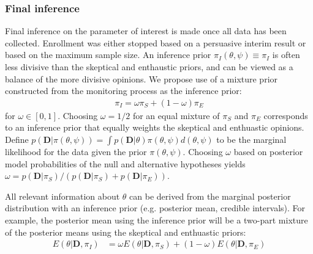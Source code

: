 \documentclass[12pt]{article}
\begin{document}
\subsubsection{Final inference}
Final inference on the parameter of interest is made once all data has been collected. Enrollment was either stopped based on a persuasive interim result or based on the maximum sample size. An inference prior $\pi_{I}(\theta,\psi)\equiv\pi_{I}$ is often less divisive than the skeptical and enthaustic priors, and can be viewed as a balance of the more divisive opinions. We propose use of a mixture prior constructed from the monitoring process as the inference prior:
\begin{align*}
\pi_{I}=\omega\pi_{S}+(1-\omega)\pi_E
\end{align*}
for $\omega\in[0,1]$. Choosing $\omega=1/2$ for an equal mixture of $\pi_S$ and $\pi_E$ corresponds to an inference prior that equally weights the skeptical and enthuastic opinions. Define $p(\mathbf{D}|\pi(\theta,\psi))=\int p(\mathbf{D}|\theta)\pi(\theta,\psi)d(\theta,\psi)$ to be the marginal likelihood for the data given the prior $\pi(\theta,\psi)$. Choosing $\omega$ based on posterior model probabilities of the null and alternative hypotheses yields $\omega=p(\mathbf{D}| \pi_{S})/(p(\mathbf{D}| \pi_{S})+p(\mathbf{D}| \pi_{E}))$. 


All relevant information about $\theta$ can be derived from the marginal posterior distribution with an inference prior (e.g. posterior mean, credible intervals). For example, the posterior mean using the inference prior will be a two-part mixture of the posterior means using the skeptical and enthuastic priors:
\begin{align*}
E(\theta|\mathbf{D},\pi_I)&=\omega E(\theta|\mathbf{D}, \pi_{S})+(1-\omega) E(\theta|\mathbf{D}, \pi_{E})%
\end{align*}
\end{document}

